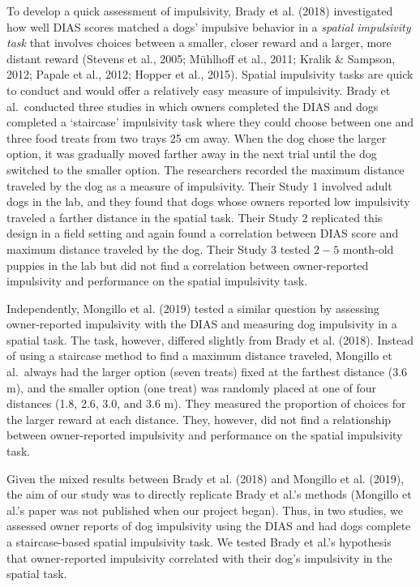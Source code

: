\documentclass[
  pub,floatsintext]{apa6}
\begin{document}
To develop a quick assessment of impulsivity, Brady et al. (2018) investigated how well DIAS scores matched a dogs' impulsive behavior in a \emph{spatial impulsivity task} that involves choices between a smaller, closer reward and a larger, more distant reward (Stevens et al., 2005; Mühlhoff et al., 2011; Kralik \& Sampson, 2012; Papale et al., 2012; Hopper et al., 2015). Spatial impulsivity tasks are quick to conduct and would offer a relatively easy measure of impulsivity. Brady et al.~conducted three studies in which owners completed the DIAS and dogs completed a `staircase' impulsivity task where they could choose between one and three food treats from two trays 25 cm away. When the dog chose the larger option, it was gradually moved farther away in the next trial until the dog switched to the smaller option. The researchers recorded the maximum distance traveled by the dog as a measure of impulsivity. Their Study 1 involved adult dogs in the lab, and they found that dogs whose owners reported low impulsivity traveled a farther distance in the spatial task. Their Study 2 replicated this design in a field setting and again found a correlation between DIAS score and maximum distance traveled by the dog. Their Study 3 tested \(2-5\) month-old puppies in the lab but did not find a correlation between owner-reported impulsivity and performance on the spatial impulsivity task.

Independently, Mongillo et al. (2019) tested a similar question by assessing owner-reported impulsivity with the DIAS and measuring dog impulsivity in a spatial task. The task, however, differed slightly from Brady et al. (2018). Instead of using a staircase method to find a maximum distance traveled, Mongillo et al.~always had the larger option (seven treats) fixed at the farthest distance (3.6 m), and the smaller option (one treat) was randomly placed at one of four distances (1.8, 2.6, 3.0, and 3.6 m). They measured the proportion of choices for the larger reward at each distance. They, however, did not find a relationship between owner-reported impulsivity and performance on the spatial impulsivity task.

Given the mixed results between Brady et al. (2018) and Mongillo et al. (2019), the aim of our study was to directly replicate Brady et al.'s methods (Mongillo et al.'s paper was not published when our project began). Thus, in two studies, we assessed owner reports of dog impulsivity using the DIAS and had dogs complete a staircase-based spatial impulsivity task. We tested Brady et al.'s hypothesis that owner-reported impulsivity correlated with their dog's impulsivity in the spatial task.
\end{document}
